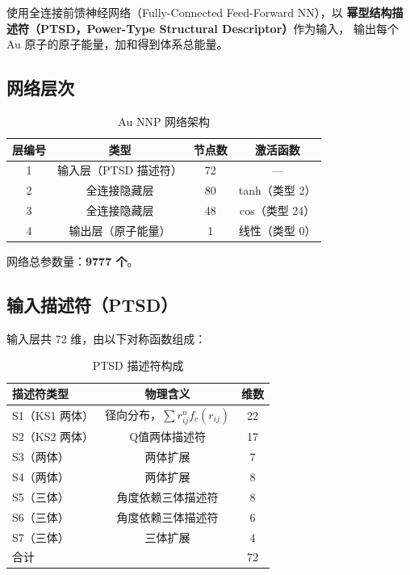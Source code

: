 \documentclass[12pt, a4paper]{article}
\begin{document}
使用全连接前馈神经网络（Fully-Connected Feed-Forward NN），以
\textbf{幂型结构描述符（PTSD，Power-Type Structural Descriptor）}作为输入，
输出每个 Au 原子的原子能量，加和得到体系总能量。

\subsection{网络层次}

\begin{table}[H]
  \centering
  \caption{Au NNP 网络架构}
  \begin{tabular}{cccc}
    \toprule
    层编号 & 类型 & 节点数 & 激活函数 \\
    \midrule
    1 & 输入层（PTSD 描述符） & 72 & --- \\
    2 & 全连接隐藏层          & 80 & tanh（类型 2） \\
    3 & 全连接隐藏层          & 48 & cos（类型 24） \\
    4 & 输出层（原子能量）    &  1 & 线性（类型 0） \\
    \bottomrule
  \end{tabular}
\end{table}

网络总参数量：\textbf{9777 个}。

\subsection{输入描述符（PTSD）}

输入层共 72 维，由以下对称函数组成：

\begin{table}[H]
  \centering
  \caption{PTSD 描述符构成}
  \begin{tabular}{lcc}
    \toprule
    描述符类型 & 物理含义 & 维数 \\
    \midrule
    S1（KS1 两体）  & 径向分布，$\sum r_{ij}^n f_c(r_{ij})$         & 22 \\
    S2（KS2 两体）  & Q值两体描述符                                  & 17 \\
    S3（两体）      & 两体扩展                                       &  7 \\
    S4（两体）      & 两体扩展                                       &  8 \\
    S5（三体）      & 角度依赖三体描述符                             &  8 \\
    S6（三体）      & 角度依赖三体描述符                             &  6 \\
    S7（三体）      & 三体扩展                                       &  4 \\
    \midrule
    合计            &                                                & 72 \\
    \bottomrule
  \end{tabular}
\end{table}
\end{document}
